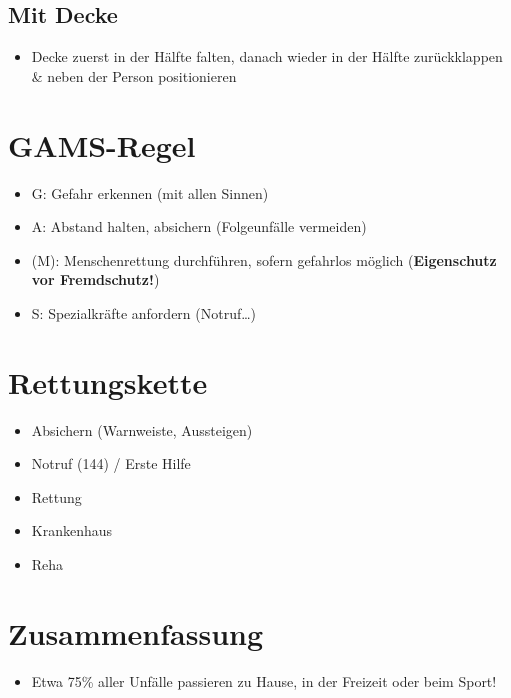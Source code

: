 \subsection*{Mit Decke}
\begin{itemize}
    \item Decke zuerst in der Hälfte falten, danach wieder in der Hälfte zurückklappen \& neben der Person positionieren
\end{itemize}

\section{GAMS-Regel}
\begin{itemize}
    \item  G:  Gefahr erkennen (mit allen Sinnen)
    \item  A:  Abstand halten, absichern (Folgeunfälle vermeiden)
    \item (M): Menschenrettung durchführen, sofern gefahrlos möglich (\textbf{Eigenschutz vor Fremdschutz!})
    \item  S:  Spezialkräfte anfordern (Notruf\dots)
\end{itemize}

\section{Rettungskette}
\begin{itemize}
    \item Absichern (Warnweiste, Aussteigen)
    \item Notruf (144) / Erste Hilfe
    \item Rettung
    \item Krankenhaus
    \item Reha
\end{itemize}

\section{Zusammenfassung}
\begin{itemize}
    \item Etwa 75\% aller Unfälle passieren zu Hause, in der Freizeit oder beim Sport!
\end{itemize}
